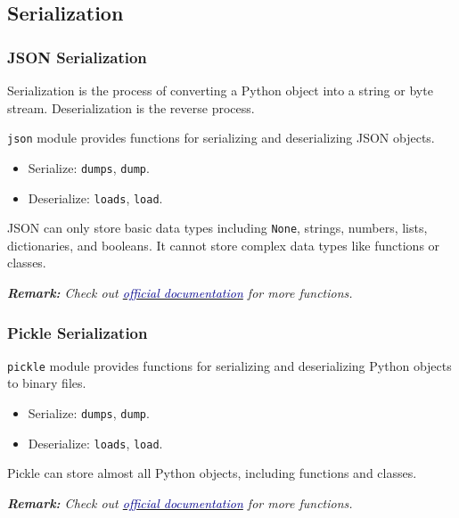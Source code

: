 \documentclass[beamer, en, version=2.0]{huangfusl-template}
\begin{document}
    \subsection{Serialization}
    \begin{frame}[fragile]
        \frametitle{JSON Serialization}

        Serialization is the process of converting a Python object into a string or byte stream. Deserialization is the reverse process.

        {\footnotesize\verb|json|} module provides functions for serializing and deserializing JSON objects.

        \begin{itemize}
            \item Serialize: {\footnotesize\verb|dumps|}, {\footnotesize\verb|dump|}.
            \item Deserialize: {\footnotesize\verb|loads|}, {\footnotesize\verb|load|}.
        \end{itemize}

        JSON can only store basic data types including {\footnotesize\verb|None|}, strings, numbers, lists, dictionaries, and booleans. It cannot store complex data types like functions or classes.

        {\footnotesize\itshape\textbf{Remark:} Check out \href{https://docs.python.org/3/library/json.html}{\textcolor{darkblue}{official documentation}} for more functions.}
    \end{frame}
    \begin{frame}[fragile]
        \frametitle{Pickle Serialization}

        {\footnotesize\verb|pickle|} module provides functions for serializing and deserializing Python objects to binary files.

        \begin{itemize}
            \item Serialize: {\footnotesize\verb|dumps|}, {\footnotesize\verb|dump|}.
            \item Deserialize: {\footnotesize\verb|loads|}, {\footnotesize\verb|load|}.
        \end{itemize}

        Pickle can store almost all Python objects, including functions and classes.

        {\footnotesize\itshape\textbf{Remark:} Check out \href{https://docs.python.org/3/library/pickle.html}{\textcolor{darkblue}{official documentation}} for more functions.}
    \end{frame}
\end{document}
